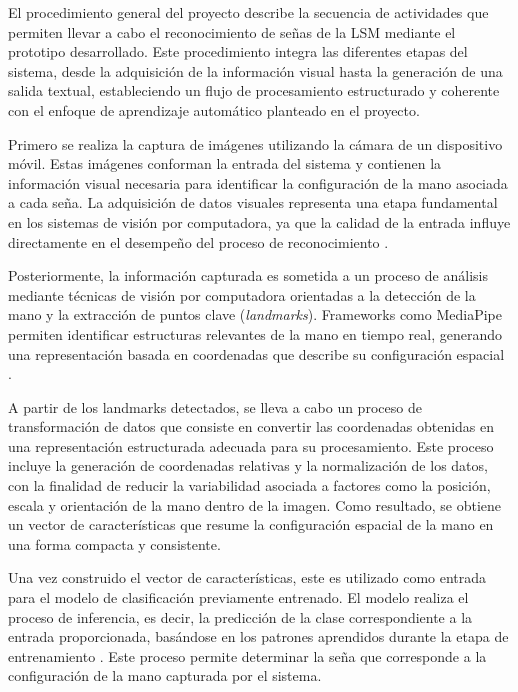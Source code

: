 	El procedimiento general del proyecto describe la secuencia de actividades que
	permiten llevar a cabo el reconocimiento de señas de la LSM mediante el prototipo desarrollado. Este procedimiento integra
	las diferentes etapas del sistema, desde la adquisición de la información
	visual hasta la generación de una salida textual, estableciendo un flujo de
	procesamiento estructurado y coherente con el enfoque de aprendizaje automático
	planteado en el proyecto.
	
	Primero se realiza la captura de imágenes utilizando la cámara de un
	dispositivo móvil. Estas imágenes conforman la entrada
	del sistema y contienen la información visual necesaria para identificar la
	configuración de la mano asociada a cada seña. La adquisición de datos visuales
	representa una etapa fundamental en los sistemas de visión por computadora, ya
	que la calidad de la entrada influye directamente en el desempeño del proceso
	de reconocimiento \cite{szeliski2010computer}.
	
	Posteriormente, la información capturada es sometida a un proceso de análisis
	mediante técnicas de visión por computadora orientadas a la detección de la
	mano y la extracción de puntos clave (\textit{landmarks}). Frameworks como MediaPipe permiten identificar estructuras relevantes de la
	mano en tiempo real, generando una representación basada en coordenadas que
	describe su configuración espacial \cite{lugaresi2019mediapipe,zhang2020mediapipehands}.
	
	A partir de los landmarks detectados, se lleva a cabo un proceso de
	transformación de datos que consiste en convertir las coordenadas obtenidas en
	una representación estructurada adecuada para su procesamiento. Este proceso
	incluye la generación de coordenadas relativas y la normalización de los datos,
	con la finalidad de reducir la variabilidad asociada a factores como la posición,
	escala y orientación de la mano dentro de la imagen. Como resultado, se obtiene
	un vector de características que resume la configuración espacial de la mano en
	una forma compacta y consistente.
	
	Una vez construido el vector de características, este es utilizado como entrada
	para el modelo de clasificación previamente entrenado. El modelo realiza el
	proceso de inferencia, es decir, la predicción de la clase correspondiente a la
	entrada proporcionada, basándose en los patrones aprendidos durante la etapa de
	entrenamiento \cite{goodfellow2016,geron2019}. Este proceso permite determinar
	la seña que corresponde a la configuración de la mano capturada por el sistema.
	

